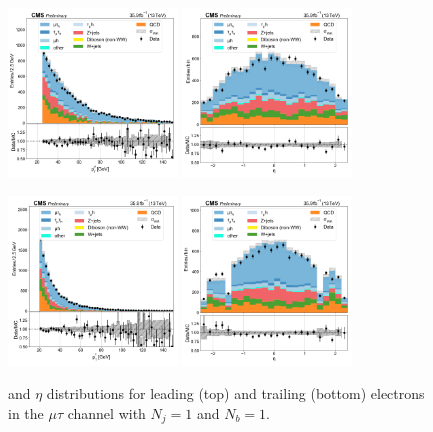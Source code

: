 \begin{figure}[htb!]
    \centering
    \includegraphics[width=0.4\textwidth]{chapters/Appendix/sectionPlots/figures/data_mc_overlays/mutau_2016_cat_eq1_eq1_signal_linear_lepton_lepton1_pt}
    \includegraphics[width=0.4\textwidth]{chapters/Appendix/sectionPlots/figures/data_mc_overlays/mutau_2016_cat_eq1_eq1_signal_linear_lepton_lepton1_eta}

    \includegraphics[width=0.4\textwidth]{chapters/Appendix/sectionPlots/figures/data_mc_overlays/mutau_2016_cat_eq1_eq1_signal_linear_lepton_lepton2_pt}
    \includegraphics[width=0.4\textwidth]{chapters/Appendix/sectionPlots/figures/data_mc_overlays/mutau_2016_cat_eq1_eq1_signal_linear_lepton_lepton2_eta}
    \caption{\pt and $\eta$ distributions for leading (top) and trailing
        (bottom) electrons in the $\mu\tau$ channel with $N_{j} = 1$ and
        $N_{b} = 1$.}
    \label{fig:mutau_3_kinematic}
\end{figure}

